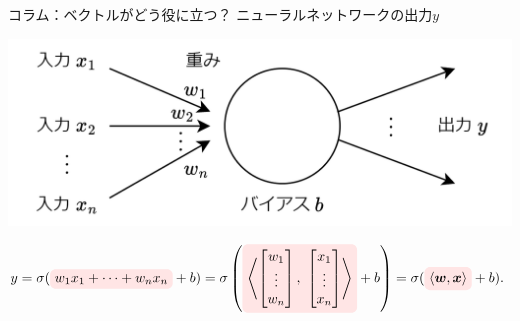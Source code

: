 \documentclass[dvipdfmx,aspectratio=169]{beamer}
\newcommand{\highlight}[2][yellow]{\tikz[baseline=(x.base)]{\node[rectangle,rounded corners,fill=#1!10](x){#2};}}
\begin{document}
	\begin{frame}{コラム：ベクトルがどう役に立つ？}
		ニューラルネットワークの出力$ y $
		\begin{center}
			\includegraphics[width=0.5\linewidth]{img/summary-of-unit}
		\end{center}
		$ y = \sigma(\highlight[red]{$ w_1x_1 + \cdots + w_nx_n $} +b) = \sigma\left(\highlight[red]{$ \left\langle\begin{bmatrix}
			w_1\\
			\vdots\\
			w_n
		\end{bmatrix},\ \begin{bmatrix}
			x_1\\
			\vdots\\
			x_n
		\end{bmatrix}\right\rangle $} + b\right) = \sigma(\highlight[red]{$ \langle\boldsymbol{w}, \boldsymbol{x}\rangle $} + b). $
	\end{frame}	
	
\end{document}
